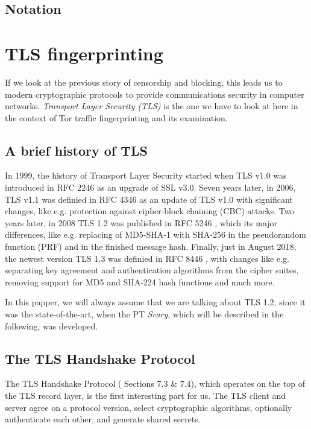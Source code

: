 \documentclass[sigconf, screen]{acmart}
\begin{document}
\subsection{Notation}
\label{ss:notation}
\section{TLS fingerprinting}
\label{s:tlsfingerprinting}
If we look at the previous story of censorship and blocking, this leads us to modern cryptographic protocols to provide communications security in computer networks. \textit{Transport Layer Security (TLS)} \cite{TLS_v1_2} is the one we have to look at here in the context of Tor traffic fingerprinting and its examination.
\subsection{A brief history of TLS}
\label{ss:abriefhistoryoftls}
In 1999, the history of Transport Layer Security started when TLS v1.0 was introduced in RFC 2246 \cite{TLS_v1_0} as an upgrade of SSL v3.0. Seven years later, in 2006, TLS v1.1 was definied in RFC 4346 \cite{TLS_v1_1} as an update of TLS v1.0 with significant changes, like e.g. protection against cipher-block chaining (CBC) attacks. Two years later, in 2008 TLS 1.2 was published in RFC 5246 \cite{TLS_v1_2}, which its major differences, like e.g. replacing of MD5-SHA-1 with SHA-256 in the pseudorandom function (PRF) and in the finished message hash. Finally, just in August 2018, the newest version TLS 1.3 was definied in RFC 8446 \cite{TLS_v1_3}, with changes like e.g. separating key agreement and authentication algorithms from the cipher suites, removing support for MD5 and SHA-224 hash functions and much more.

In this papper, we will always assume that we are talking about TLS 1.2, since it was the state-of-the-art, when the PT \textit{Scary}, which will be described in the following, was developed.
\subsection{The TLS Handshake Protocol}
\label{ss:thetlshandshakeprotocol}
The TLS Handshake Protocol (\cite{TLS_v1_2} Sections 7.3 \& 7.4), which operates on the top of the TLS record layer, is the first interesting part for us. The TLS client and server agree on a protocol version, select cryptographic algorithms, optionally authenticate each other, and generate shared secrets.
\end{document}
